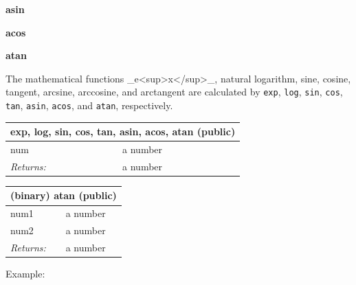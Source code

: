 \documentclass[twoside,9pt]{report}
\begin{document}
\textbf{asin}


\textbf{acos}


\textbf{atan}


The mathematical functions \_e<sup>x</sup>\_, natural logarithm, sine, cosine, tangent, arcsine, arccosine, and arctangent are calculated by \texttt{exp}, \texttt{log}, \texttt{sin}, \texttt{cos}, \texttt{tan}, \texttt{asin}, \texttt{acos}, and \texttt{atan}, respectively.

\begin{tabular}{ |l l| }
\hline
\multicolumn{2}{|l|}{exp, log, sin, cos, tan, asin, acos, atan (public)} \\
\hline
num & a number \\
\textit{Returns:} & a number \\
\hline
\end{tabular}

\begin{tabular}{ |l l| }
\hline
\multicolumn{2}{|l|}{(binary) atan (public)} \\
\hline
num1 & a number \\
num2 & a number \\
\textit{Returns:} & a number \\
\hline
\end{tabular}


Example:
\end{document}
